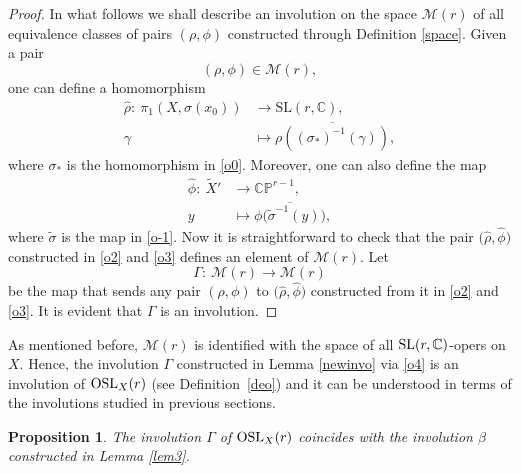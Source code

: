 \documentclass[pdftex]{sigma}
\numberwithin{equation}{section}
\newtheorem{Proposition}[Theorem]{Proposition}
 { \theoremstyle{definition}
\newtheorem{Definition}[Theorem]{Definition}
\newtheorem{Note}[Theorem]{Note}
\newtheorem{Example}[Theorem]{Example}
\newtheorem{Remark}[Theorem]{Remark} }
\begin{document}
\begin{proof}
In what follows we shall describe an involution on the space ${\mathcal M}(r)$ of all equivalence
classes of pairs $(\rho, \phi)$ constructed through Definition \ref{space}.
Given a pair
\[%
(\rho, \phi) \in {\mathcal M}(r),
\]
one can define a homomorphism
\begin{align}
\widehat{\rho}\colon\ \pi_1(X, \sigma(x_0)) &\longrightarrow \text{SL}(r, {\mathbb C}),\nonumber\\
\gamma &\mapsto \overline{\rho((\sigma_*)^{-1}(\gamma))},\label{o2}
\end{align}
where $\sigma_*$ is the homomorphism in
\eqref{o0}.
Moreover, one can also define the map
\begin{align}
\widehat{\phi}\colon\ \widetilde{X}' &\longrightarrow {\mathbb C}{\mathbb P}^{r-1},\nonumber\\
y&\mapsto\overline{\phi\bigl(\widetilde{\sigma}^{-1}(y)\bigr)}, \label{o3}
\end{align}
where $\widetilde{\sigma}$ is the map in \eqref{o-1}. Now it is straightforward to
check that the pair $\bigl(\widehat{\rho}, \widehat{\phi}\bigr)$ constructed in \eqref{o2}
and \eqref{o3} defines an element of ${\mathcal M}(r)$. Let
\begin{equation}\label{o4}
\Gamma\colon\ {\mathcal M}(r) \longrightarrow {\mathcal M}(r)
\end{equation}
be the map that sends any pair $(\rho, \phi)$ to $\bigl(\widehat{\rho}, \widehat{\phi}\bigr)$
constructed from it in \eqref{o2} and \eqref{o3}. It is evident that $\Gamma$ is an involution.\end{proof}

As mentioned before,
${\mathcal M}(r)$ is identified with the space of all
${\rm SL}(r, {\mathbb C})$-opers on $X$. Hence, the involution $\Gamma$ constructed in Lemma \ref{newinvo} via \eqref{o4}
is an involution of ${\rm OSL}_X(r)$ (see Definition~\ref{deo}) and it can be understood in terms of the involutions studied in previous sections.

\begin{Proposition}\label{prop3}
The involution $\Gamma$ of ${\rm OSL}_X(r)$ coincides with the involution
$\beta$ constructed in Lemma {\rm \ref{lem3}}.
\end{Proposition}
\end{document}
